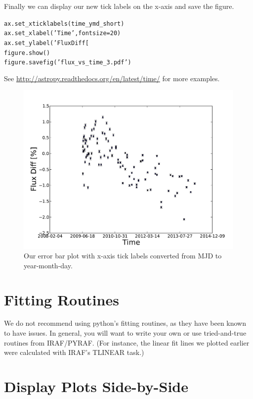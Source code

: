 Finally we can display our new tick labels on the x-axis and save the figure.

\begin{alltt}
\pytab ax.set\_xticklabels(time\_ymd\_short)
\pytab ax.set\_xlabel('Time', fontsize=20)
\pytab ax.set\_ylabel('Flux Diff [%
\pytab figure.show()
\pytab figure.savefig('flux_vs_time_3.pdf')
\end{alltt}

See \href{http://astropy.readthedocs.org/en/latest/time/}{http://astropy.readthedocs.org/en/latest/time/} for more examples.

\begin{figure}[tbp]
  \centering
    \includegraphics[scale=0.55]{flux_vs_time_3.pdf}
    \caption{Our error bar plot with x-axis tick labels converted from MJD to year-month-day.}
  \label{fig:flux_vs_time_3}
\end{figure}

\section{Fitting Routines}

We do not recommend using python's fitting routines, as they have been 
known to have issues. In general, you will want to write your own or use
tried-and-true routines from IRAF/PYRAF.  (For instance, the linear fit lines 
we plotted earlier were calculated with IRAF's TLINEAR task.)


\section{Display Plots Side-by-Side}

